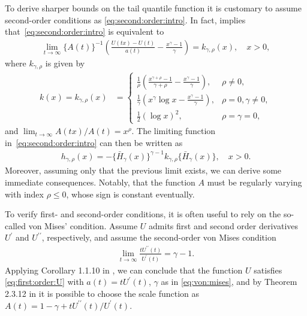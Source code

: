 \documentclass{statsoc}
\theoremstyle{break}
\newcommand{\beam}{\begin{eqnarray}}
\newcommand{\eeam}{\end{eqnarray}\noindent}
\begin{document}
To derive sharper bounds on the tail quantile function it is customary to assume second-order conditions as \eqref{eq:second:order:intro}.
In fact, \citet[Theorem B.3.19]{dehaan:ferreira:2006} implies that~\eqref{eq:second:order:intro} is equivalent to
\begin{eqnarray}\label{eq:second:order:condition}
	\lim_{t \to \infty} \{A(t)\}^{-1} \left(\frac{U(tx) - U(t)}{ a(t) } -  \frac{x^\gamma - 1} {\gamma}\right)
	= k_{\gamma,\rho}(x)  , \quad x>0,
\end{eqnarray} 
where $k_{\gamma,\rho}$ is given by
\begin{align}\label{eq:krho}
	k(x) = k_{\gamma,\rho}(x) &=
	\begin{cases}
		\frac{1}{\rho}
		\left( 
		\frac{ x^{\gamma+\rho} - 1}{\gamma + \rho} 
		- \frac{x^\gamma-1}{\gamma} \right), & \rho \not = 0 ,\\
		\frac{1}{\gamma}
		\left( 
		x^{\gamma}\log x 
		- \frac{x^\gamma-1}{\gamma}\right), & \rho = 0, \gamma \not = 0 ,\\
		\frac{1}{2} (\log x)^2, & \rho = \gamma = 0,
	\end{cases}
\end{align}
and $\lim_{t \to \infty} A(tx)/A(t) = x^{\rho}$.
The limiting function in~\eqref{eq:second:order:intro} 
can then be written as 
\begin{align}\label{eq:hrho}
	h_{\gamma, \rho}(x) = - \{\bar H_\gamma(x)\}^{\gamma - 1} k_{\gamma, \rho}\{\bar H_\gamma(x)\}, \quad {x >0 }.
\end{align}
Moreover, assuming only that the previous limit exists, we can derive some immediate consequences.
Notably, that the function $A$ must be regularly varying with index $\rho \leq 0$, whose sign is constant eventually.


To verify first- and second-order conditions, it is often useful to rely on the so-called von Mises' condition. 
Assume $U$ admits first and second order derivatives $U^\prime$ and $U^{\prime \prime}$, respectively, and assume the second-order von Mises condition
\beam \label{eq:von:mises}
\lim_{t \to \infty} \frac{t U^{\prime \prime}(t)}{U^\prime(t)} = \gamma - 1.
\eeam 
Applying Corollary 1.1.10 in \citep{dehaan:ferreira:2006}, we can conclude that  the function $U$ satisfies \eqref{eq:first:order:U} with $a(t) = t U^\prime(t)$, $\gamma$ as in \eqref{eq:von:mises}, and by Theorem 2.3.12 in \cite{dehaan:ferreira:2006} it is possible to choose the scale function as 
$A(t) = 1-\gamma + tU^{\prime \prime }(t)/U^\prime(t)$. 
\end{document}
